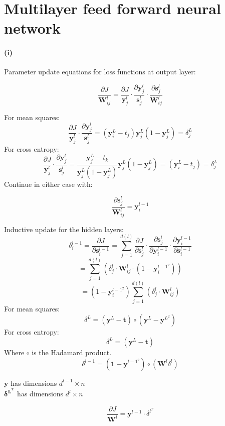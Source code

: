 \documentclass{article}
\begin{document}
\section*{Multilayer feed forward neural network}

\paragraph{(i)} Parameter update equations for loss functions at output layer:

$$\dfrac{\partial{J}}{\mathbf{W}_{ij}^{l}} = \dfrac{\partial{J}}{\mathbf{y}_{j}^{l}}\cdot \dfrac{\partial{\mathbf{y}_j^{l}}}{\mathbf{s}_{j}^{l}}\cdot\dfrac{\partial{\mathbf{s}_j^{l}}}{\mathbf{W}_{ij}^{l}}$$

For mean squares:
$$\dfrac{\partial{J}}{\mathbf{y}_{j}^{l}}\cdot \dfrac{\partial{\mathbf{y}_j^{l}}}{\mathbf{s}_{j}^{l}} = (\mathbf{y}_i^{L} - t_j)\mathbf{y}_j^{L}(1-\mathbf{y}_j^{L}) = \delta _j ^{L}$$
For cross entropy:
$$\dfrac{\partial{J}}{\mathbf{y}_{j}^{l}}\cdot \dfrac{\partial{\mathbf{y}_j^{l}}}{\mathbf{s}_{j}^{l}} = \frac{\mathbf{y}_j^{L} - t_k}{\mathbf{y}_j^{L} (1 - \mathbf{y}_j^{L})}\mathbf{y}_j^{L}(1-\mathbf{y}_j^{L}) = (\mathbf{y}_i^{L} - t_j) = \delta_j^{L}$$
Continue in either case with:

$$\dfrac{\partial{\mathbf{s}_j^{l}}}{\mathbf{W}_{ij}^{l}} = \mathbf{y}_i^{l-1}$$

Inductive update for the hidden layers:
$$\delta_i^{l-1} = \dfrac{\partial{J}}{\partial{\mathbf{s}_i^{l-1}}} = \sum_{j=1}^{d(l)}\dfrac{\partial{J}}{\partial{\mathbf{s}_j^{l}}}\cdot\dfrac{\partial{\mathbf{s}_j^{l}}}{\partial{\mathbf{y}_{i}^{l-1}}}\cdot \dfrac{\partial{\mathbf{y}_i^{l-1}}}{\partial{\mathbf{s}_{i}^{l-1}}}$$
$$= \sum_{j=1}^{d(l)}(\delta_j^{l} \cdot \mathbf{W}_{ij}^{l} \cdot (1-\mathbf{y}_i^{l-1^2}))$$
$$=(1-\mathbf{y}_i^{l-1^2})\sum_{j=1}^{d(l)}(\delta_j^{l} \cdot \mathbf{W}_{ij}^{l})$$
For mean squares:
$$\delta ^ {L} = (\mathbf{y}^{L} - \mathbf{t})\circ (\mathbf{y}^{L} - \mathbf{y}^{L^2})$$
For cross entropy:
$$\delta ^ {L} = (\mathbf{y}^{L} - \mathbf{t})$$
Where $\circ$ is the Hadamard product.
$$\delta^{l-1} = (\mathbf{1}-\mathbf{y}^{{l-1}^{2}})\circ (\mathbf{W}^l\delta ^{l})$$

$\mathbf{y}$ has dimensions $d^{l-1}\times n$\\
$\mathbf{\delta^{L^T}}$ has dimensions $d^{l} \times n$


$$\dfrac{\partial{J}}{\mathbf{W}^{l}} = \mathbf{y}^{l-1} \cdot \delta^{l^T} $$
\end{document}

